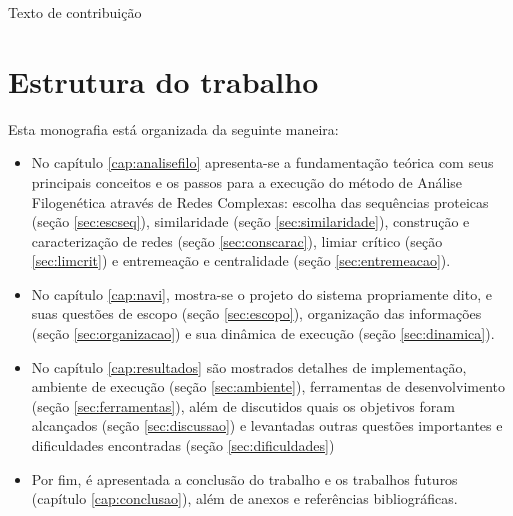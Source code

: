 Texto de contribuição

\section{Estrutura do trabalho}

Esta monografia está organizada da seguinte maneira:

\begin{itemize}
  \item{No capítulo \ref{cap:analisefilo} apresenta-se a fundamentação teórica com seus principais conceitos
e os passos para a execução do método de Análise Filogenética através de Redes Complexas: escolha das sequências proteicas (seção \ref{sec:escseq}),
similaridade (seção \ref{sec:similaridade}), construção e caracterização de redes (seção \ref{sec:conscarac}), limiar crítico (seção \ref{sec:limcrit})
e entremeação e centralidade (seção \ref{sec:entremeacao}).}
  \item{No capítulo \ref{cap:navi}, mostra-se o projeto do sistema propriamente dito, e suas questões
de escopo (seção \ref{sec:escopo}), organização das informações (seção \ref{sec:organizacao}) e sua dinâmica de execução (seção \ref{sec:dinamica}).}
  \item{No capítulo \ref{cap:resultados} são mostrados detalhes de implementação, ambiente de execução (seção \ref{sec:ambiente}), ferramentas de
desenvolvimento (seção \ref{sec:ferramentas}), além de discutidos quais os objetivos foram alcançados (seção \ref{sec:discussao}) e levantadas
outras questões importantes e dificuldades encontradas (seção \ref{sec:dificuldades})}
  \item{Por fim, é apresentada a conclusão do trabalho e os trabalhos futuros (capítulo \ref{cap:conclusao}), além de anexos e referências bibliográficas.}
\end{itemize}





